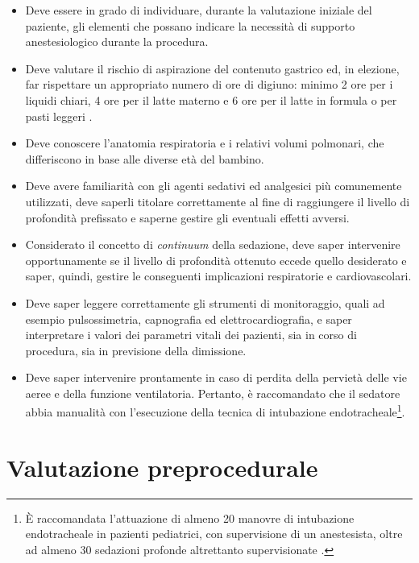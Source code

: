 \begin{itemize}
    \item Deve essere in grado di individuare, durante la valutazione iniziale del paziente, gli elementi che possano indicare la necessità di supporto anestesiologico durante la procedura.
    \item Deve valutare il rischio di aspirazione del contenuto gastrico ed, in elezione, far rispettare un appropriato numero di ore di digiuno: minimo 2 ore per i liquidi chiari, 4 ore per il latte materno e 6 ore per il latte in formula o per pasti leggeri \cite{Guidelines2019}. 
    \item Deve conoscere l'anatomia respiratoria e i relativi volumi polmonari, che differiscono in base alle diverse età del bambino. 
    \item Deve avere familiarità con gli agenti sedativi ed analgesici più comunemente utilizzati, deve saperli titolare correttamente al fine di raggiungere il livello di profondità prefissato e saperne gestire gli eventuali effetti avversi. 
    \item Considerato il concetto di \emph{continuum} della sedazione, deve saper intervenire opportunamente se il livello di profondità ottenuto eccede quello desiderato e saper, quindi, gestire le conseguenti implicazioni respiratorie e cardiovascolari. 
    \item Deve saper leggere correttamente gli strumenti di monitoraggio, quali ad esempio pulsossimetria, capnografia ed elettrocardiografia, e saper interpretare i valori dei parametri vitali dei pazienti, sia in corso di procedura, sia in previsione della dimissione. 
    \item Deve saper intervenire prontamente in caso di perdita della pervietà delle vie aeree e della funzione ventilatoria. Pertanto, è raccomandato che il sedatore abbia manualità con l'esecuzione della tecnica di intubazione endotracheale\footnote{\`E raccomandata l'attuazione di almeno 20 manovre di intubazione endotracheale in pazienti pediatrici, con supervisione di un anestesista, oltre ad almeno 30 sedazioni profonde altrettanto supervisionate \cite{Simeupsedazione}.}.
\end{itemize}

\section{Valutazione preprocedurale}

